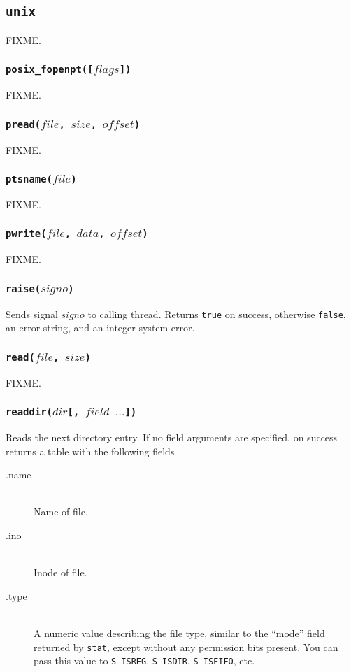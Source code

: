\documentclass[11pt, oneside]{memoir}
\newcommand*{\true}[0]{\texttt{true}\xspace}
\newcommand*{\false}[0]{\texttt{false}\xspace}
\newcommand*{\syscall}[1]{\texttt{#1}\xspace}
\newcommand*{\fn}[1]{\texttt{#1}\xspace}
\newcounter{toccols}
\newenvironment{Module}[1]{
	\subsection{\texttt{#1}}
	\addtocontents{toc}{
		\protect\begin{multicols}{\value{toccols}}
	}
}{
	\addtocontents{toc}{\protect\end{multicols}}
}
\begin{document}
\begin{Module}{unix}
FIXME.

\subsubsection[\fn{posix\_fopenpt}]{\fn{posix\_fopenpt([$flags$])}}

FIXME.

\subsubsection[\fn{pread}]{\fn{pread($file$, $size$, $offset$)}}

FIXME.

\subsubsection[\fn{ptsname}]{\fn{ptsname($file$)}}

FIXME.

\subsubsection[\fn{pwrite}]{\fn{pwrite($file$, $data$, $offset$)}}

FIXME.

\subsubsection[\fn{raise}]{\fn{raise($signo$)}}

Sends signal $signo$ to calling thread. Returns \true on success, otherwise \false, an error string, and an integer system error.

\subsubsection[\fn{read}]{\fn{read($file$, $size$)}}

FIXME.

\subsubsection[\fn{readdir}]{\fn{readdir($dir$[, $field$ $\ldots$])}}

Reads the next directory entry. If no field arguments are specified, on success returns a table with the following fields

\begin{description}
\item[.name] \hfill \\
Name of file.
\item[.ino] \hfill \\
Inode of file.
\item[.type] \hfill \\
A numeric value describing the file type, similar to the ``mode'' field returned by \syscall{stat}, except without any permission bits present. You can pass this value to \fn{S\_ISREG}, \fn{S\_ISDIR}, \fn{S\_ISFIFO}, etc.


\end{description}
\end{Module}
\end{document}
